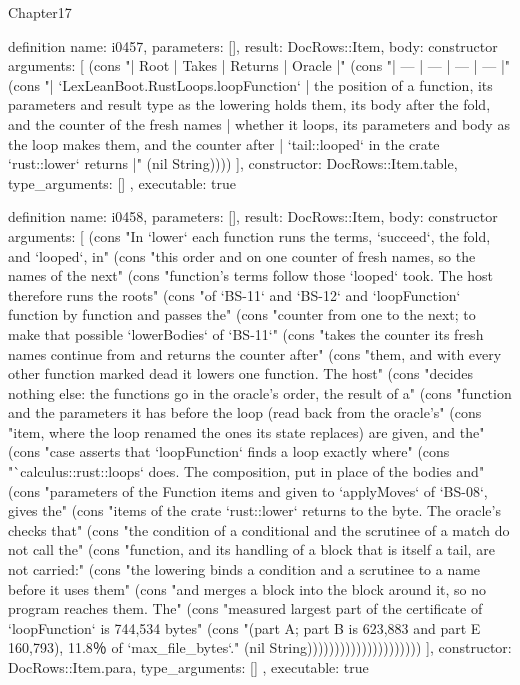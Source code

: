 \begin{lexlean}{Chapter17}
\begin{semanticmodule}
definition{
  name: i0457,
  parameters: [],
  result: DocRows::Item,
  body: constructor{
    arguments: [
      (cons "| Root | Takes | Returns | Oracle |" (cons "| --- | --- | --- | --- |" (cons "| `LexLeanBoot.RustLoops.loopFunction` | the position of a function, its parameters and result type as the lowering holds them, its body after the fold, and the counter of the fresh names | whether it loops, its parameters and body as the loop makes them, and the counter after | `tail::looped` in the crate `rust::lower` returns |" (nil String))))
    ],
    constructor: DocRows::Item.table,
    type_arguments: []
  },
  executable: true
}

definition{
  name: i0458,
  parameters: [],
  result: DocRows::Item,
  body: constructor{
    arguments: [
      (cons "In `lower` each function runs the terms, `succeed`, the fold, and `looped`, in" (cons "this order and on one counter of fresh names, so the names of the next" (cons "function's terms follow those `looped` took. The host therefore runs the roots" (cons "of `BS-11` and `BS-12` and `loopFunction` function by function and passes the" (cons "counter from one to the next; to make that possible `lowerBodies` of `BS-11`" (cons "takes the counter its fresh names continue from and returns the counter after" (cons "them, and with every other function marked dead it lowers one function. The host" (cons "decides nothing else: the functions go in the oracle's order, the result of a" (cons "function and the parameters it has before the loop (read back from the oracle's" (cons "item, where the loop renamed the ones its state replaces) are given, and the" (cons "case asserts that `loopFunction` finds a loop exactly where" (cons "`calculus::rust::loops` does. The composition, put in place of the bodies and" (cons "parameters of the Function items and given to `applyMoves` of `BS-08`, gives the" (cons "items of the crate `rust::lower` returns to the byte. The oracle's checks that" (cons "the condition of a conditional and the scrutinee of a match do not call the" (cons "function, and its handling of a block that is itself a tail, are not carried:" (cons "the lowering binds a condition and a scrutinee to a name before it uses them" (cons "and merges a block into the block around it, so no program reaches them. The" (cons "measured largest part of the certificate of `loopFunction` is 744,534 bytes" (cons "(part A; part B is 623,883 and part E 160,793), 11.8％ of `max_file_bytes`." (nil String)))))))))))))))))))))
    ],
    constructor: DocRows::Item.para,
    type_arguments: []
  },
  executable: true
}


\end{semanticmodule}
\end{lexlean}

